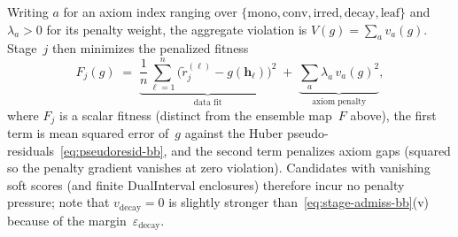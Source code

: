 \documentclass[11pt]{article}
\theoremstyle{plain}
\theoremstyle{remark}
\begin{document}
Writing $a$ for an axiom index ranging over $\{\mathrm{mono},\mathrm{conv},\mathrm{irred},\mathrm{decay},\mathrm{leaf}\}$ and $\lambda_a > 0$ for its penalty weight, the aggregate violation is $V(g)=\sum_a v_a(g)$.
Stage~$j$ then minimizes the penalized fitness
\begin{equation}\label{eq:penalized-bb}
    F_j(g) \;=\;
    \underbrace{\frac{1}{n} \sum_{\ell=1}^{n}
      \bigl(\tilde{r}_j^{(\ell)} - g(\mathbf{h}_\ell)\bigr)^2}_{\text{data fit}}
    \;+\;
    \underbrace{\sum_a \lambda_a \, v_a(g)^2}_{\text{axiom penalty}} ,
\end{equation}
where $F_j$ is a scalar fitness (distinct from the ensemble map~$F$ above), the first term is mean squared error of~$g$ against the Huber pseudo-residuals~\eqref{eq:pseudoresid-bb}, and the second term penalizes axiom gaps (squared so the penalty gradient vanishes at zero violation).
Candidates with vanishing soft scores (and finite DualInterval enclosures) therefore incur no penalty pressure; note that $v_{\mathrm{decay}}=0$ is slightly stronger than~\eqref{eq:stage-admiss-bb}(v) because of the margin~$\varepsilon_{\mathrm{decay}}$.
\end{document}
